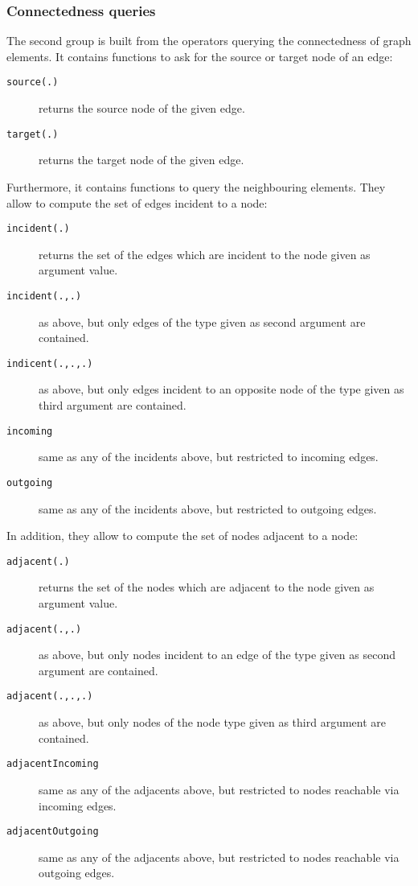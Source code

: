\subsubsection*{Connectedness queries}\label{neighbouringelementsfunctions}
The second group is built from the operators querying the connectedness of graph elements.
It contains functions to ask for the source or target node of an edge: 

\begin{description}
\item[\texttt{source(.)}] returns the source node of the given edge.
\item[\texttt{target(.)}] returns the target node of the given edge.
\end{description}

Furthermore, it contains functions to query the neighbouring elements.
They allow to compute the set of edges incident to a node:

\begin{description}
\item[\texttt{incident(.)}] returns the set of the edges which are incident to the node given as argument value.
\item[\texttt{incident(.,.)}] as above, but only edges of the type given as second argument are contained.
\item[\texttt{indicent(.,.,.)}] as above, but only edges incident to an opposite node of the type given as third argument are contained.
\item[\texttt{incoming}] same as any of the incidents above, but restricted to incoming edges.
\item[\texttt{outgoing}] same as any of the incidents above, but restricted to outgoing edges.
\end{description}

In addition, they allow to compute the set of nodes adjacent to a node:

\begin{description}
\item[\texttt{adjacent(.)}] returns the set of the nodes which are adjacent to the node given as argument value.
\item[\texttt{adjacent(.,.)}] as above, but only nodes incident to an edge of the type given as second argument are contained.
\item[\texttt{adjacent(.,.,.)}] as above, but only nodes of the node type given as third argument are contained.
\item[\texttt{adjacentIncoming}] same as any of the adjacents above, but restricted to nodes reachable via incoming edges.
\item[\texttt{adjacentOutgoing}] same as any of the adjacents above, but restricted to nodes reachable via outgoing edges.
\end{description}

